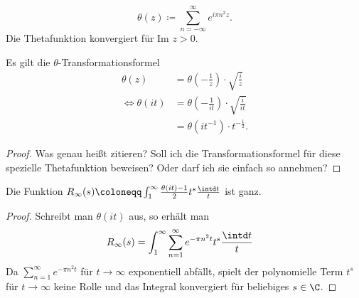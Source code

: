 \documentclass{article}
\begin{document}
\begin{definition}[Thetafunktion]
    \[
        \theta(z) \coloneqq \sum_{n = -\infty}^\infty e^{i\pi n^2z}.
    \]
    Die Thetafunktion konvergiert für Im $z > 0$.
\end{definition}
\begin{lemma}
    Es gilt die $\theta$-Transformationsformel
    \begin{align*}
        \theta(z) &= \theta\left(-\frac{1}{z}\right)\cdot \sqrt{\frac{i}{z}}\\
        \Leftrightarrow \theta(it) &= \theta\left(-\frac{1}{it}\right) \cdot \sqrt{\frac{i}{it}}\\
        &= \theta\left(it^{-1}\right)\cdot t^{-\frac{1}{2}}.
    \end{align*}
\end{lemma}
\begin{proof}
    Was genau heißt zitieren? Soll ich die Transformationsformel für diese spezielle Thetafunktion beweisen? Oder darf ich sie einfach so annehmen?
\end{proof}

\begin{lemma}
    Die Funktion $R_\infty(s) \coloneqq \int_1^\infty \frac{\theta(it)-1}{2} t^s \frac{\intd t}{t}$ ist ganz.
\end{lemma}
\begin{proof}
    Schreibt man $\theta(it)$ aus, so erhält man
    \begin{align*}
        R_\infty(s) &= \int_1^\infty \sum_{n=1}^\infty e^{-\pi n^2 t} t^s \frac{\intd t}{t}
    \end{align*}
    Da $\sum_{n=1}^\infty e^{-\pi n^2 t}$ für $t\to \infty$ exponentiell abfällt, spielt der polynomielle Term $t^s$ für $t\to\infty$ keine Rolle und das Integral konvergiert für beliebiges $s\in \C$.
\end{proof}
\end{document}
